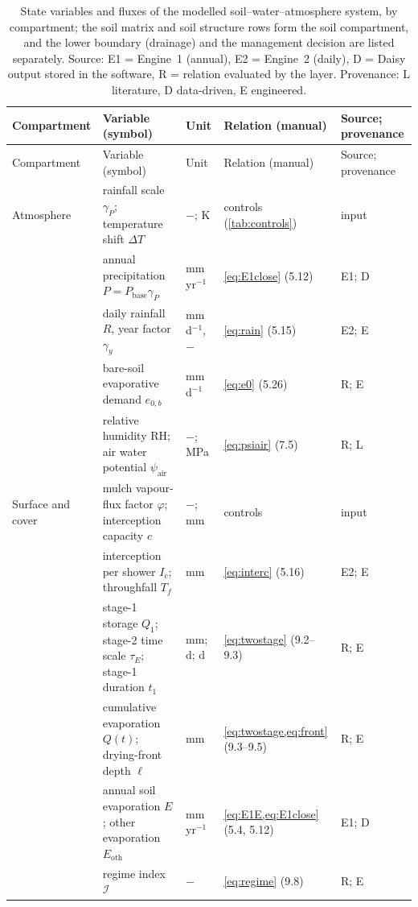 {\small
\begin{longtable}{>{\raggedright\arraybackslash}p{2.3cm}>{\raggedright\arraybackslash}p{3.8cm}>{\raggedright\arraybackslash}p{1.8cm}>{\raggedright\arraybackslash}p{4.0cm}>{\raggedright\arraybackslash}p{1.9cm}}
\caption{State variables and fluxes of the modelled soil--water--atmosphere system, by compartment; the soil matrix and soil structure rows form the soil compartment, and the lower boundary (drainage) and the management decision are listed separately. Source: E1 = Engine~1 (annual), E2 = Engine~2 (daily), D = Daisy output stored in the software, R = relation evaluated by the layer. Provenance: L literature, D data-driven, E engineered.}\label{tab:compartments}\\
\toprule
Compartment & Variable (symbol) & Unit & Relation (manual) & Source; provenance\\\midrule\endfirsthead
\toprule Compartment & Variable (symbol) & Unit & Relation (manual) & Source; provenance\\\midrule\endhead
Atmosphere & rainfall scale $\gamma_P$; temperature shift $\Delta T$ & $-$; K & controls (\cref{tab:controls}) & input\\
 & annual precipitation $P=P_{\mathrm{base}}\gamma_P$ & mm\,yr$^{-1}$ & \cref{eq:E1close} (5.12) & E1; D\\
 & daily rainfall $R$, year factor $\gamma_y$ & mm\,d$^{-1}$, $-$ & \cref{eq:rain} (5.15) & E2; E\\
 & bare-soil evaporative demand $e_{0,b}$ & mm\,d$^{-1}$ & \cref{eq:e0} (5.26) & R; E\\
 & relative humidity RH; air water potential $\psi_{\mathrm{air}}$ & $-$; MPa & \cref{eq:psiair} (7.5) & R; L\\
Surface and cover & mulch vapour-flux factor $\varphi$; interception capacity $c$ & $-$; mm & controls & input\\
 & interception per shower $I_c$; throughfall $T_f$ & mm & \cref{eq:interc} (5.16) & E2; E\\
 & stage-1 storage $Q_1$; stage-2 time scale $\tau_E$; stage-1 duration $t_1$ & mm; d; d & \cref{eq:twostage} (9.2--9.3) & R; E\\
 & cumulative evaporation $Q(t)$; drying-front depth $\ell$ & mm & \cref{eq:twostage,eq:front} (9.3--9.5) & R; E\\
 & annual soil evaporation $E$; other evaporation $E_{\mathrm{oth}}$ & mm\,yr$^{-1}$ & \cref{eq:E1E,eq:E1close} (5.4, 5.12) & E1; D\\
 & regime index $\mathcal I$ & $-$ & \cref{eq:regime} (9.8) & R; E\\

\end{longtable}}
